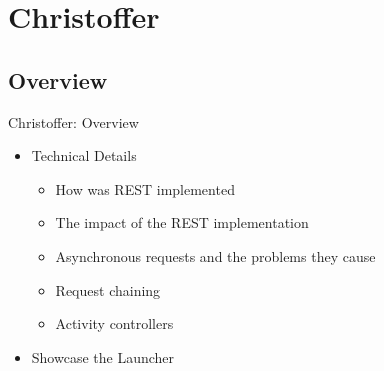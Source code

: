 \section{Christoffer}
\subsection{Overview}


\begin{frame}{Christoffer: Overview}
\begin{itemize}
  \item Technical Details
  		\begin{itemize}
  			\item How was REST implemented
  			\item The impact of the REST implementation
  			\item Asynchronous requests and the problems they cause
  			\item Request chaining
  			\item Activity controllers
		\end{itemize}
  \item Showcase the Launcher
\end{itemize}
\end{frame}

